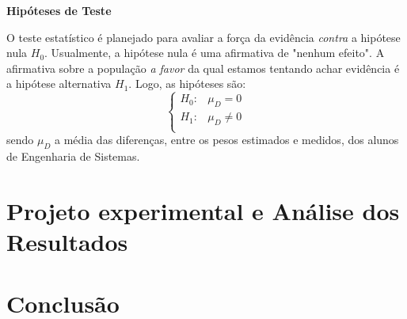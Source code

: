 \documentclass[12pt, a4paper]{article}
\begin{document}
\textbf{Hipóteses de Teste}
\par O teste estatístico é planejado para avaliar a força da evidência \textit{contra} a hipótese nula $H_{0}$. Usualmente, a hipótese nula é uma afirmativa de "nenhum efeito". A afirmativa sobre a população \textit{a favor} da qual estamos tentando achar evidência é a hipótese alternativa $H_{1}$. Logo, as hipóteses são:
\begin{equation}
\left \{
\begin{array}{cc}
H_{0}: & \mu_{D} = 0 \\
H_{1}: & \mu_{D} \neq 0 \\
\end{array}
\right.
\end{equation}
\newline sendo $\mu_{D}$ a média das diferenças, entre os pesos estimados e medidos, dos alunos de Engenharia de Sistemas.

\section{Projeto experimental e Análise dos Resultados}
\label{sec:projeto-experimental}

\section{Conclusão}

\begin{thebibliography}{6}
\end{thebibliography}		
		
\end{document}
